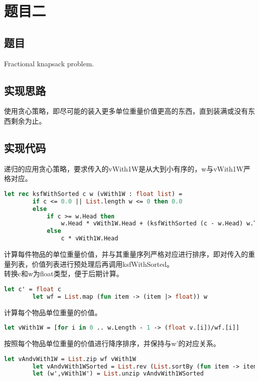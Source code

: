 \documentclass[a4paper]{article}
\begin{document}
\section{题目二}

\subsection{题目}

Fractional knapsack problem.

\subsection{实现思路}

使用贪心策略，即尽可能的装入更多单位重量价值更高的东西，直到装满或没有东西剩余为止。

\subsection{实现代码}

递归的应用贪心策略，要求传入的vWith1W是从大到小有序的，w与vWith1W严格对应。

\begin{lstlisting}[language=ML]
    let rec ksfWithSorted c w (vWith1W : float list) =
        if c <= 0.0 || List.length w <= 0 then 0.0
        else
            if c >= w.Head then
                w.Head * vWith1W.Head + (ksfWithSorted (c - w.Head) w.Tail vWith1W.Tail)
            else
                c * vWith1W.Head
\end{lstlisting}

计算每件物品的单位重量价值，并与其重量序列严格对应进行排序，即对传入的重量列表，价值列表进行预处理后再调用ksfWithSorted。\\

转换c和w为float类型，便于后期计算。

\begin{lstlisting}[language=ML]
        let c' = float c
        let wf = List.map (fun item -> (item |> float)) w
\end{lstlisting}

计算每个物品单位重量的价值。
\begin{lstlisting}[language=ML]
        let vWith1W = [for i in 0 .. w.Length - 1 -> (float v.[i])/wf.[i]]
\end{lstlisting}

按照每个物品单位重量的价值进行降序排序，并保持与w'的对应关系。
\begin{lstlisting}[language=ML]
        let vAndvWith1W = List.zip wf vWith1W
        let vAndvWith1WSorted = List.rev (List.sortBy (fun item -> item |> snd) vAndvWith1W)
        let (w',vWith1W') = List.unzip vAndvWith1WSorted
\end{lstlisting}
\end{document}
